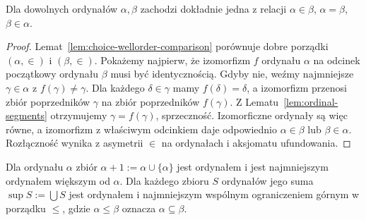\begin{twierdzenie}\label{thm:ordinal-trichotomy}
Dla dowolnych ordynałów $\alpha,\beta$ zachodzi dokładnie jedna z relacji $\alpha\in\beta$, $\alpha=\beta$, $\beta\in\alpha$.
\end{twierdzenie}
\begin{proof}
Lemat~\ref{lem:choice-wellorder-comparison} porównuje dobre porządki $(\alpha,\in)$ i $(\beta,\in)$. Pokażemy najpierw, że izomorfizm $f$ ordynału $\alpha$ na odcinek początkowy ordynału $\beta$ musi być identycznością. Gdyby nie, weźmy najmniejsze $\gamma\in\alpha$ z $f(\gamma)\ne\gamma$. Dla każdego $\delta\in\gamma$ mamy $f(\delta)=\delta$, a izomorfizm przenosi zbiór poprzedników $\gamma$ na zbiór poprzedników $f(\gamma)$. Z Lematu~\ref{lem:ordinal-segments} otrzymujemy $\gamma=f(\gamma)$, sprzeczność. Izomorficzne ordynały są więc równe, a izomorfizm z właściwym odcinkiem daje odpowiednio $\alpha\in\beta$ lub $\beta\in\alpha$. Rozłączność wynika z asymetrii $\in$ na ordynałach i aksjomatu ufundowania.
\end{proof}
\begin{wniosek}\label{cor:ordinal-sup}
Dla ordynału $\alpha$ zbiór $\alpha+1:=\alpha\cup\{\alpha\}$ jest ordynałem i jest najmniejszym ordynałem większym od $\alpha$. Dla każdego zbioru $S$ ordynałów jego suma $\sup S:=\bigcup S$ jest ordynałem i najmniejszym wspólnym ograniczeniem górnym w porządku $\le$, gdzie $\alpha\le\beta$ oznacza $\alpha\subseteq\beta$.
\end{wniosek}
